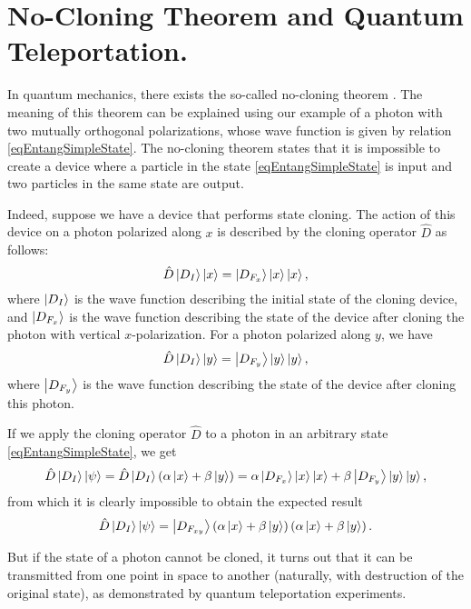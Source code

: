 \section{No-Cloning Theorem and Quantum Teleportation.}
\label{pPart3EntangleNoClone}
In quantum mechanics, there exists the so-called no-cloning theorem \cite{bNoClone}. The meaning of this theorem can be explained using our example of a photon with two mutually orthogonal polarizations, whose wave function is given by relation \eqref{eqEntangSimpleState}. The no-cloning theorem states that it is impossible to create a device where a particle in the state \eqref{eqEntangSimpleState} is input and two particles in the same state are output.

Indeed, suppose we have a device that performs state cloning. The action of this device on a photon polarized along $x$ is described by the cloning operator $\hat{D}$ as follows:
\begin{equation}
  \hat{D} \ket{D_I}\ket{x} = \ket{D_{F_x}}\ket{x}\ket{x},
  \nonumber
\end{equation}
where $\ket{D_I}$ is the wave function describing the initial state of the cloning device, and $\ket{D_{F_x}}$ is the wave function describing the state of the device after cloning the photon with vertical $x$-polarization. For a photon polarized along $y$, we have
\begin{equation}
  \hat{D} \ket{D_I}\ket{y} = \ket{D_{F_y}}\ket{y}\ket{y},
  \nonumber
\end{equation}
where $\ket{D_{F_y}}$ is the wave function describing the state of the device after cloning this photon.

If we apply the cloning operator $\hat{D}$ to a photon in an arbitrary state \eqref{eqEntangSimpleState}, we get
\begin{equation}
  \hat{D} \ket{D_I}\left|\psi\right> = 
  \hat{D} \ket{D_I} \left(\alpha \ket{x} +
  \beta \ket{y}\right) = 
  \alpha \ket{D_{F_x}}\ket{x}\ket{x} +
  \beta \ket{D_{F_y}}\ket{y}\ket{y},
  \nonumber
\end{equation}
from which it is clearly impossible to obtain the expected result
\begin{equation}
  \hat{D} \ket{D_I}\left|\psi\right> = 
  \ket{D_{F_{xy}}}  \left(\alpha \ket{x} +
  \beta \ket{y}\right)
  \left(\alpha \ket{x} +
  \beta \ket{y}\right).
  \nonumber
\end{equation}

But if the state of a photon cannot be cloned, it turns out that it can be transmitted from one point in space to another (naturally, with destruction of the original state), as demonstrated by quantum teleportation experiments.

